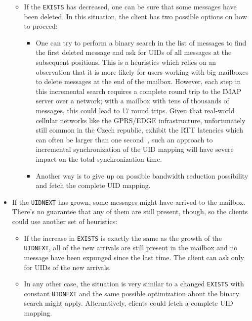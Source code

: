 \documentclass[trojita]{subfiles}
\begin{document}
\begin{itemize}
\begin{itemize}
      \item If the {\tt EXISTS} has decreased, one can be sure that some messages have been deleted.  In this situation,
        the client has two possible options on how to proceed:
        \begin{itemize}
          \item One can try to perform a binary search in the list of messages to find the first deleted message and ask
            for UIDs of all messages at the subsequent positions.  This is a heuristics which relies on an observation
            that it is more likely for users working with big mailboxes to delete messages at the end of the mailbox.
            However, each step in this incremental search requires a complete round trip to the IMAP server over a
            network; with a mailbox with tens of thousands of messages, this could lead to 17 round trips.  Given that
            real-world cellular networks like the GPRS/EDGE infrastructure, unfortunately still common in the Czech
            republic, exhibit the RTT latencies which can often be larger than one second~\cite{gprs-rtt-report}, such
            an approach to incremental synchronization of the UID mapping will have severe impact on the total
            synchronization time.
          \item Another way is to give up on possible bandwidth reduction possibility and fetch the complete UID
            mapping.
        \end{itemize}
    \end{itemize}
  \item If the {\tt UIDNEXT} has grown, some messages might have arrived to the mailbox.  There's no guarantee that any
    of them are still present, though, so the clients could use another set of heuristics:
    \begin{itemize}
      \item If the increase in {\tt EXISTS} is exactly the same as the growth of the {\tt UIDNEXT}, all of the new
        arrivals are still present in the mailbox and no message have been expunged since the last time.  The client can
        ask only for UIDs of the new arrivals.
      \item In any other case, the situation is very similar to a changed {\tt EXISTS} with constant {\tt UIDNEXT} and
        the same possible optimization about the binary search might apply.  Alternatively, clients could fetch a
        complete UID mapping.
    \end{itemize}
\end{itemize}
\end{document}

